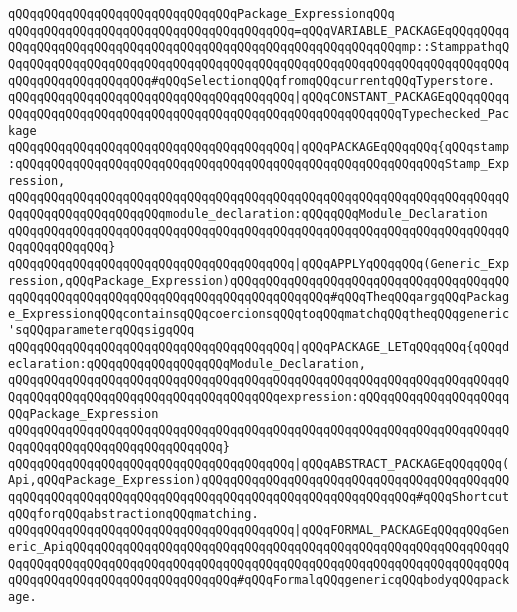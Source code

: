 \verb|qQQqqQQqqQQqqQQqqQQqqQQqqQQqqQQqPackage_ExpressionqQQq|\newline
\verb|qQQqqQQqqQQqqQQqqQQqqQQqqQQqqQQqqQQqqQQq=qQQqVARIABLE_PACKAGEqQQqqQQqqQQqqQQqqQQqqQQqqQQqqQQqqQQqqQQqqQQqqQQqqQQqqQQqqQQqqQQqmp::StamppathqQQqqQQqqQQqqQQqqQQqqQQqqQQqqQQqqQQqqQQqqQQqqQQqqQQqqQQqqQQqqQQqqQQqqQQqqQQqqQQqqQQqqQQqqQQq#qQQqSelectionqQQqfromqQQqcurrentqQQqTyperstore.|\newline
\verb|qQQqqQQqqQQqqQQqqQQqqQQqqQQqqQQqqQQqqQQq|\verb#|qQQqCONSTANT_PACKAGEqQQqqQQqqQQqqQQqqQQqqQQqqQQqqQQqqQQqqQQqqQQqqQQqqQQqqQQqqQQqqQQqTypechecked_Package#\newline
\verb|qQQqqQQqqQQqqQQqqQQqqQQqqQQqqQQqqQQqqQQq|\verb#|qQQqPACKAGEqQQqqQQq{qQQqstamp:qQQqqQQqqQQqqQQqqQQqqQQqqQQqqQQqqQQqqQQqqQQqqQQqqQQqqQQqqQQqStamp_Expression,#\newline
\verb|qQQqqQQqqQQqqQQqqQQqqQQqqQQqqQQqqQQqqQQqqQQqqQQqqQQqqQQqqQQqqQQqqQQqqQQqqQQqqQQqqQQqqQQqqQQqmodule_declaration:qQQqqQQqModule_Declaration|\newline
\verb|qQQqqQQqqQQqqQQqqQQqqQQqqQQqqQQqqQQqqQQqqQQqqQQqqQQqqQQqqQQqqQQqqQQqqQQqqQQqqQQqqQQq}|\newline
\verb|qQQqqQQqqQQqqQQqqQQqqQQqqQQqqQQqqQQqqQQq|\verb#|qQQqAPPLYqQQqqQQq(Generic_Expression,qQQqPackage_Expression)qQQqqQQqqQQqqQQqqQQqqQQqqQQqqQQqqQQqqQQqqQQqqQQqqQQqqQQqqQQqqQQqqQQqqQQqqQQqqQQqqQQq#\verb|#qQQqTheqQQqargqQQqPackage_ExpressionqQQqcontainsqQQqcoercionsqQQqtoqQQqmatchqQQqtheqQQqgeneric'sqQQqparameterqQQqsigqQQq|\newline
\verb|qQQqqQQqqQQqqQQqqQQqqQQqqQQqqQQqqQQqqQQq|\verb#|qQQqPACKAGE_LETqQQqqQQq{qQQqdeclaration:qQQqqQQqqQQqqQQqqQQqModule_Declaration,#\newline
\verb|qQQqqQQqqQQqqQQqqQQqqQQqqQQqqQQqqQQqqQQqqQQqqQQqqQQqqQQqqQQqqQQqqQQqqQQqqQQqqQQqqQQqqQQqqQQqqQQqqQQqqQQqqQQqexpression:qQQqqQQqqQQqqQQqqQQqqQQqPackage_Expression|\newline
\verb|qQQqqQQqqQQqqQQqqQQqqQQqqQQqqQQqqQQqqQQqqQQqqQQqqQQqqQQqqQQqqQQqqQQqqQQqqQQqqQQqqQQqqQQqqQQqqQQqqQQq}|\newline
\verb|qQQqqQQqqQQqqQQqqQQqqQQqqQQqqQQqqQQqqQQq|\verb#|qQQqABSTRACT_PACKAGEqQQqqQQq(Api,qQQqPackage_Expression)qQQqqQQqqQQqqQQqqQQqqQQqqQQqqQQqqQQqqQQqqQQqqQQqqQQqqQQqqQQqqQQqqQQqqQQqqQQqqQQqqQQqqQQqqQQqqQQqqQQq#\verb|#qQQqShortcutqQQqforqQQqabstractionqQQqmatching.|\newline
\verb|qQQqqQQqqQQqqQQqqQQqqQQqqQQqqQQqqQQqqQQq|\verb#|qQQqFORMAL_PACKAGEqQQqqQQqGeneric_ApiqQQqqQQqqQQqqQQqqQQqqQQqqQQqqQQqqQQqqQQqqQQqqQQqqQQqqQQqqQQqqQQqqQQqqQQqqQQqqQQqqQQqqQQqqQQqqQQqqQQqqQQqqQQqqQQqqQQqqQQqqQQqqQQqqQQqqQQqqQQqqQQqqQQqqQQqqQQqqQQqqQQq#\verb|#qQQqFormalqQQqgenericqQQqbodyqQQqpackage.|\newline
